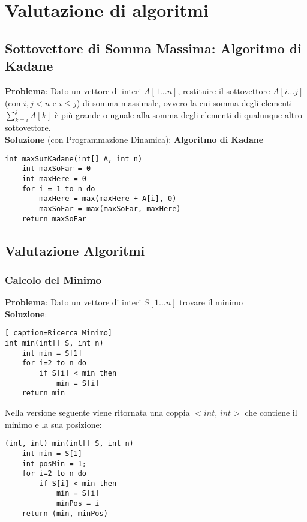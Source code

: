 \documentclass[../cheatSheetAlgoritmi.tex]{subfiles}
\begin{document}
\chapter{Valutazione di algoritmi}
\section{Sottovettore di Somma Massima: Algoritmo di Kadane}
\textbf{Problema}: Dato un vettore di interi $A[1...n]$, restituire il sottovettore $A[i...j]$ (con $i, j < n$ e $i \leq j$) di somma massimale, ovvero la cui somma degli elementi $\sum_{k=i}^j A[k]$ è più grande o uguale alla somma degli elementi di qualunque altro sottovettore.\\
\textbf{Soluzione} (con Programmazione Dinamica): \textbf{Algoritmo di Kadane}
\begin{lstlisting}[caption=Kadane Algorithm]
int maxSumKadane(int[] A, int n)
	int maxSoFar = 0
	int maxHere = 0
	for i = 1 to n do
		maxHere = max(maxHere + A[i], 0)
		maxSoFar = max(maxSoFar, maxHere)
	return maxSoFar
\end{lstlisting}

\section{Valutazione Algoritmi} \subsection{Calcolo del Minimo}
\textbf{Problema}: Dato un vettore di interi $S[1...n]$ trovare il minimo\\
\textbf{Soluzione}:
\begin{lstlisting}[ caption=Ricerca Minimo]
int min(int[] S, int n)
	int min = S[1]
	for i=2 to n do
		if S[i] < min then
			min = S[i]
	return min
\end{lstlisting}
Nella versione seguente viene ritornata una coppia $<$$int$, $int$$>$ che contiene il minimo e la sua posizione:
\begin{lstlisting}[caption=Ricerca Minimo ritornando gli indici]
(int, int) min(int[] S, int n)
	int min = S[1]
	int posMin = 1;
	for i=2 to n do
		if S[i] < min then
			min = S[i]
			minPos = i
	return (min, minPos)
\end{lstlisting}
\newpage
\end{document}
